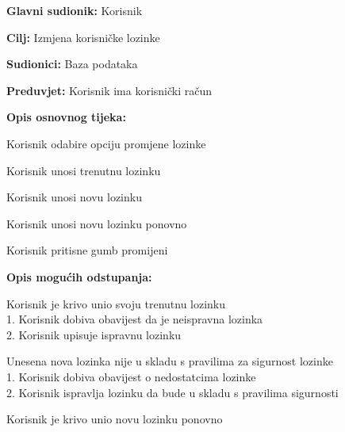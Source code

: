 					\noindent {}
					\begin{packed_item}
						\item \textbf{Glavni sudionik:} Korisnik
						\item \textbf{Cilj:} Izmjena korisničke lozinke
						\item \textbf{Sudionici:} Baza podataka
						\item \textbf{Preduvjet:} Korisnik ima korisnički račun
						\item \textbf{Opis osnovnog tijeka:}
						\begin{packed_enum}
							\item Korisnik odabire opciju promjene lozinke
							\item Korisnik unosi trenutnu lozinku
							\item Korisnik unosi novu lozinku
							\item Korisnik unosi novu lozinku ponovno
							\item Korisnik pritisne gumb promijeni
						\end{packed_enum}
						\item \textbf{Opis mogućih odstupanja:}
						\begin{packed_item}
							\item [2.a] Korisnik je krivo unio svoju trenutnu lozinku
							\\1. Korisnik dobiva obavijest da je neispravna lozinka
							\\2. Korisnik upisuje ispravnu lozinku
							\item [3.a] Unesena nova lozinka nije u skladu s pravilima za sigurnost lozinke
							\\1. Korisnik dobiva obavijest o nedostatcima lozinke
							\\2. Korisnik ispravlja lozinku da bude u skladu s pravilima sigurnosti
							\item [4.a] Korisnik je krivo unio novu lozinku ponovno
						\end{packed_item}
					\end{packed_item}
					
